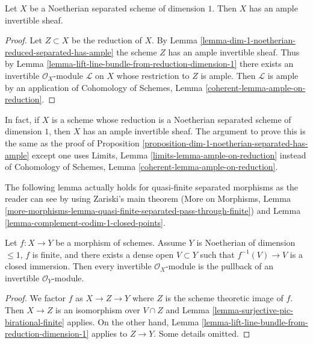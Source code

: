\begin{proposition}
\label{proposition-dim-1-noetherian-separated-has-ample}
Let $X$ be a Noetherian separated scheme of dimension $1$.
Then $X$ has an ample invertible sheaf.
\end{proposition}

\begin{proof}
Let $Z \subset X$ be the reduction of $X$. By
Lemma \ref{lemma-dim-1-noetherian-reduced-separated-has-ample}
the scheme $Z$ has an ample invertible sheaf.
Thus by Lemma \ref{lemma-lift-line-bundle-from-reduction-dimension-1}
there exists an invertible $\mathcal{O}_X$-module $\mathcal{L}$
on $X$ whose restriction to $Z$ is ample.
Then $\mathcal{L}$ is ample by an application of
Cohomology of Schemes, Lemma \ref{coherent-lemma-ample-on-reduction}.
\end{proof}

\begin{remark}
\label{remark-useless-generalization}
In fact, if $X$ is a scheme whose reduction is a Noetherian
separated scheme of dimension $1$, then $X$ has an ample invertible
sheaf. The argument to prove this is the same as the proof of
Proposition \ref{proposition-dim-1-noetherian-separated-has-ample}
except one uses
Limits, Lemma \ref{limits-lemma-ample-on-reduction}
instead of
Cohomology of Schemes, Lemma \ref{coherent-lemma-ample-on-reduction}.
\end{remark}

\noindent
The following lemma actually holds for quasi-finite separated morphisms
as the reader can see by using Zariski's main theorem
(More on Morphisms, Lemma
\ref{more-morphisms-lemma-quasi-finite-separated-pass-through-finite})
and Lemma \ref{lemma-complement-codim-1-closed-points}.

\begin{lemma}
\label{lemma-surjection-on-pic-quasi-finite}
Let $f : X \to Y$ be a morphism of schemes. Assume
$Y$ is Noetherian of dimension $\leq 1$, $f$ is finite, and
there exists a dense open $V \subset Y$ such that
$f^{-1}(V) \to V$ is a closed immersion. Then every invertible
$\mathcal{O}_X$-module is the pullback of an invertible $\mathcal{O}_Y$-module.
\end{lemma}

\begin{proof}
We factor $f$ as $X \to Z \to Y$ where $Z$ is the scheme theoretic
image of $f$. Then $X \to Z$ is an isomorphism over $V \cap Z$
and Lemma \ref{lemma-surjective-pic-birational-finite} applies.
On the other hand,
Lemma \ref{lemma-lift-line-bundle-from-reduction-dimension-1}
applies to $Z \to Y$. Some details omitted.
\end{proof}








